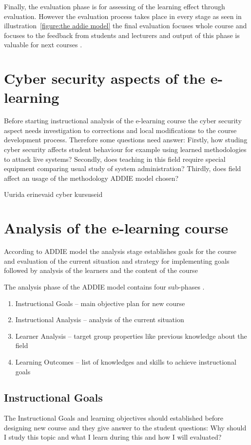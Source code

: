 Finally, the evaluation phase is for assessing of the learning effect through evaluation. However the evaluation process takes place in every stage as seen in illustration~\ref{figure:the addie model} the final evaluation focuses whole course and focuses to the feedback from students and lecturers and output of this phase is valuable for next courses \citep{OppeArenduskeskus2010, website:addie}.



\section{Cyber security aspects of the e-learning}
Before starting instructional analysis of the e-learning course the cyber security aspect needs investigation to corrections and local modifications to the course development process. Therefore some questions need answer: Firstly, how studing cyber security affects student behaviour for example using learned methodologies to attack live systems? Secondly, does teaching in this field require special equipment comparing usual study of system administration? Thirdly, does field affect an usage of the methodology \gls{ADDIE} model chosen?

{\color{red} Uurida erinevaid cyber kursuseid } 


\section{Analysis of the e-learning course}
According to \gls{ADDIE} model the analysis stage establishes goals for the course and evaluation of the current situation and strategy for implementing goals followed by analysis of the learners and the content of the course \citep{website:addie}

The analysis phase of the \gls{ADDIE} model contains four sub-phases \citep{website:addie}.
\begin{enumerate}
\item Instructional Goals -- main objective plan for new course
\item Instructional Analysis -- analysis of the current situation
\item Learner Analysis -- target group properties like previous knowledge about the field
\item Learning Outcomes -- list of knowledges and skills to achieve instructional goals
\end{enumerate}


\subsection{Instructional Goals}
The Instructional Goals and learning objectives should established before designing new course and they give answer to the student questions: Why should I study this topic and what I learn during this and how I will evaluated? \citep{website:addie}


